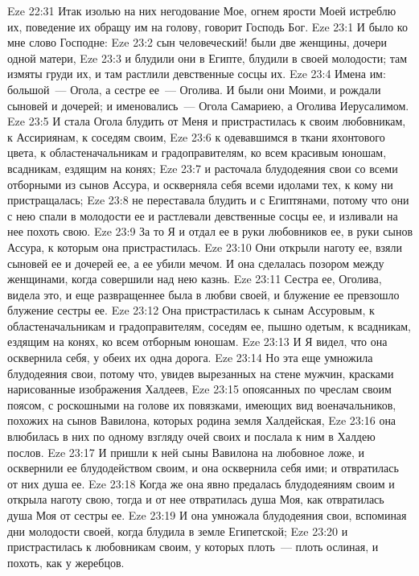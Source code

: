 \vs Eze 22:31 Итак изолью на них негодование Мое, огнем ярости Моей истреблю их, поведение их обращу им на голову, говорит Господь Бог.
\vs Eze 23:1 И было ко мне слово Господне:
\vs Eze 23:2 сын человеческий! были две женщины, дочери одной матери,
\vs Eze 23:3 и блудили они в Египте, блудили в своей молодости; там измяты груди их, и там растлили девственные сосцы их.
\vs Eze 23:4 Имена им: большой~--- Огола, а сестре ее~--- Оголива. И были они Моими, и рождали сыновей и дочерей; и именовались~--- Огола Самариею, а Оголива Иерусалимом.
\vs Eze 23:5 И стала Огола блудить от Меня и пристрастилась к своим любовникам, к Ассириянам, к соседям своим,
\vs Eze 23:6 к одевавшимся в ткани яхонтового цвета, к областеначальникам и градоправителям, ко всем красивым юношам, всадникам, ездящим на конях;
\vs Eze 23:7 и расточала блудодеяния свои со всеми отборными из сынов Ассура, и оскверняла себя всеми идолами тех, к кому ни пристращалась;
\vs Eze 23:8 не переставала блудить и с Египтянами, потому что они с нею спали в молодости ее и растлевали девственные сосцы ее, и изливали на нее похоть свою.
\vs Eze 23:9 За то Я и отдал ее в руки любовников ее, в руки сынов Ассура, к которым она пристрастилась.
\vs Eze 23:10 Они открыли наготу ее, взяли сыновей ее и дочерей ее, а ее убили мечом. И она сделалась позором между женщинами, когда совершили над нею казнь.
\vs Eze 23:11 Сестра ее, Оголива, видела это, и еще развращеннее была в любви своей, и блужение ее превзошло блужение сестры ее.
\vs Eze 23:12 Она пристрастилась к сынам Ассуровым, к областеначальникам и градоправителям, соседям ее, пышно одетым, к всадникам, ездящим на конях, ко всем отборным юношам.
\vs Eze 23:13 И Я видел, что она осквернила себя,  у обеих их одна дорога.
\vs Eze 23:14 Но эта еще умножила блудодеяния свои, потому что, увидев вырезанных на стене мужчин, красками нарисованные изображения Халдеев,
\vs Eze 23:15 опоясанных по чреслам своим поясом, с роскошными на голове их повязками, имеющих вид военачальников, похожих на сынов Вавилона, которых родина земля Халдейская,
\vs Eze 23:16 она влюбилась в них по одному взгляду очей своих и послала к ним в Халдею послов.
\vs Eze 23:17 И пришли к ней сыны Вавилона на любовное ложе, и осквернили ее блудодейством своим, и она осквернила себя ими; и отвратилась от них душа ее.
\vs Eze 23:18 Когда же она явно предалась блудодеяниям своим и открыла наготу свою, тогда и от нее отвратилась душа Моя, как отвратилась душа Моя от сестры ее.
\vs Eze 23:19 И она умножала блудодеяния свои, вспоминая дни молодости своей, когда блудила в земле Египетской;
\vs Eze 23:20 и пристрастилась к любовникам своим, у которых плоть~--- плоть ослиная, и похоть, как у жеребцов.

